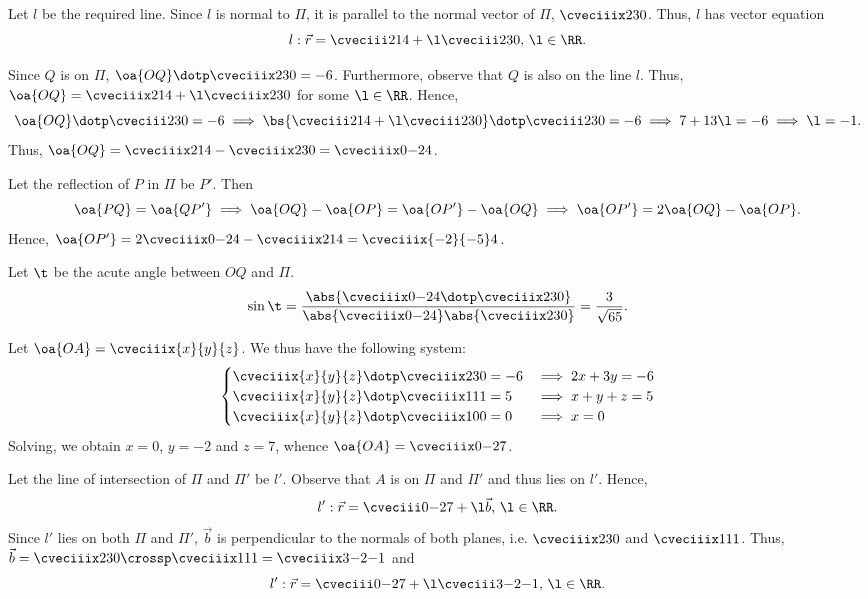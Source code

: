 \begin{solution}
    \begin{ppart}
        Let $l$ be the required line. Since $l$ is normal to $\Pi$, it is parallel to the normal vector of $\Pi$, $\cveciiix230$. Thus, $l$ has vector equation \[l: \vec r = \cveciii214 + \l\cveciii230, \, \l \in \RR.\]
    \end{ppart}
    \begin{ppart}
        Since $Q$ is on $\Pi$, $\oa{OQ} \dotp \cveciiix230 = -6$. Furthermore, observe that $Q$ is also on the line $l$. Thus, $\oa{OQ} = \cveciiix214 + \l\cveciiix230$ for some $\l \in \RR$. Hence, \[\oa{OQ} \dotp \cveciii230 = -6 \implies\bs{\cveciii214 + \l\cveciii230} \dotp \cveciii230 = -6 \implies 7 + 13\l = -6 \implies \l = -1.\] Thus, $\oa{OQ} = \cveciiix214 - \cveciiix230 = \cveciiix0{-2}4$.

        Let the reflection of $P$ in $\Pi$ be $P'$. Then  \[\oa{PQ} = \oa{QP'} \implies \oa{OQ} - \oa{OP} = \oa{OP'}- \oa{OQ} \implies \oa{OP'} = 2\oa{OQ} - \oa{OP}.\] Hence, $\oa{OP'} = 2\cveciiix0{-2}4 - \cveciiix214 = \cveciiix{-2}{-5}4$.
    \end{ppart}
    \begin{ppart}
        Let $\t$ be the acute angle between $OQ$ and $\Pi$. \[\sin\t = \frac{\abs{\cveciiix0{-2}4 \dotp \cveciiix230}}{\abs{\cveciiix0{-2}4} \abs{\cveciiix230}} = \frac{3}{\sqrt{65}}.\]
    \end{ppart}
    \begin{ppart}
        Let $\oa{OA} = \cveciiix{x}{y}{z}$. We thus have the following system: \[
                \begin{cases}
                    \cveciiix{x}{y}{z} \dotp \cveciiix230 = -6 &\implies 2x+3y=-6\\
                    \cveciiix{x}{y}{z} \dotp \cveciiix111 = 5 &\implies x+y+z = 5\\
                    \cveciiix{x}{y}{z} \dotp \cveciiix100 = 0 &\implies x = 0
                \end{cases}
        \] Solving, we obtain $x = 0$, $y = -2$ and $z = 7$, whence $\oa{OA} = \cveciiix0{-2}7$.
    \end{ppart}
    \begin{ppart}
        Let the line of intersection of $\Pi$ and $\Pi'$ be $l'$. Observe that $A$ is on $\Pi$ and $\Pi'$ and thus lies on $l'$. Hence, \[l': \vec r = \cveciii0{-2}7 + \l\vec b, \, \l \in \RR.\] Since $l'$ lies on both $\Pi$ and $\Pi'$, $\vec b$ is perpendicular to the normals of both planes, i.e. $\cveciiix230$ and $\cveciiix111$. Thus, $\vec b = \cveciiix230 \crossp \cveciiix111 = \cveciiix3{-2}{-1}$ and \[l': \vec r = \cveciii0{-2}7 + \l\cveciii3{-2}{-1}, \, \l \in \RR.\]
    \end{ppart}
\end{solution}

